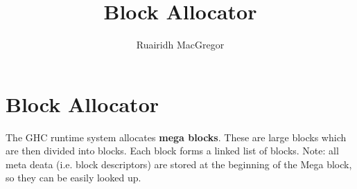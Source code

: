 \documentclass[a4paper,11pt]{article}
\title{Block Allocator}
\author{Ruairidh MacGregor}
\date{}
\begin{document}
\maketitle

\section{Block Allocator}

The GHC runtime system allocates \textbf{mega blocks}. These are large blocks which are then divided into blocks. Each block forms a linked list of blocks. Note: all meta deata (i.e. block descriptors) are stored at the beginning of the Mega block, so they can be easily looked up.
\end{document}
